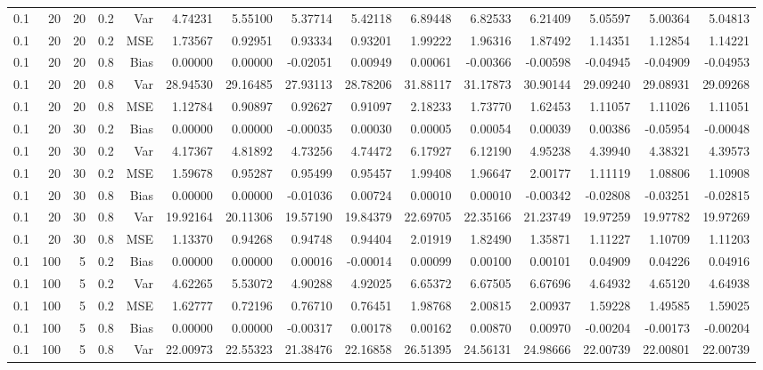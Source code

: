 \begin{table}[!htbp]
\begin{tabular}{lrrrrrrrrrrrrrr}
0.1 &  20 & 20 & 0.2 & Var & 4.74231 & 5.55100 & 5.37714 & 5.42118 & 6.89448 & 6.82533 & 6.21409 & 5.05597 & 5.00364 & 5.04813 \\
0.1 &  20 & 20 & 0.2 & MSE & 1.73567 & 0.92951 & 0.93334 & 0.93201 & 1.99222 & 1.96316 & 1.87492 & 1.14351 & 1.12854 & 1.14221 \\
0.1 &  20 & 20 & 0.8 & Bias & 0.00000 & 0.00000 & -0.02051 & 0.00949 & 0.00061 & -0.00366 & -0.00598 & -0.04945 & -0.04909 & -0.04953 \\
0.1 &  20 & 20 & 0.8 & Var & 28.94530 & 29.16485 & 27.93113 & 28.78206 & 31.88117 & 31.17873 & 30.90144 & 29.09240 & 29.08931 & 29.09268 \\
0.1 &  20 & 20 & 0.8 & MSE & 1.12784 & 0.90897 & 0.92627 & 0.91097 & 2.18233 & 1.73770 & 1.62453 & 1.11057 & 1.11026 & 1.11051 \\
0.1 &  20 & 30 & 0.2 & Bias & 0.00000 & 0.00000 & -0.00035 & 0.00030 & 0.00005 & 0.00054 & 0.00039 & 0.00386 & -0.05954 & -0.00048 \\
0.1 &  20 & 30 & 0.2 & Var & 4.17367 & 4.81892 & 4.73256 & 4.74472 & 6.17927 & 6.12190 & 4.95238 & 4.39940 & 4.38321 & 4.39573 \\
0.1 &  20 & 30 & 0.2 & MSE & 1.59678 & 0.95287 & 0.95499 & 0.95457 & 1.99408 & 1.96647 & 2.00177 & 1.11119 & 1.08806 & 1.10908 \\
0.1 &  20 & 30 & 0.8 & Bias & 0.00000 & 0.00000 & -0.01036 & 0.00724 & 0.00010 & 0.00010 & -0.00342 & -0.02808 & -0.03251 & -0.02815 \\
0.1 &  20 & 30 & 0.8 & Var & 19.92164 & 20.11306 & 19.57190 & 19.84379 & 22.69705 & 22.35166 & 21.23749 & 19.97259 & 19.97782 & 19.97269 \\
0.1 &  20 & 30 & 0.8 & MSE & 1.13370 & 0.94268 & 0.94748 & 0.94404 & 2.01919 & 1.82490 & 1.35871 & 1.11227 & 1.10709 & 1.11203 \\
0.1 & 100 &  5 & 0.2 & Bias & 0.00000 & 0.00000 & 0.00016 & -0.00014 & 0.00099 & 0.00100 & 0.00101 & 0.04909 & 0.04226 & 0.04916 \\
0.1 & 100 &  5 & 0.2 & Var & 4.62265 & 5.53072 & 4.90288 & 4.92025 & 6.65372 & 6.67505 & 6.67696 & 4.64932 & 4.65120 & 4.64938 \\
0.1 & 100 &  5 & 0.2 & MSE & 1.62777 & 0.72196 & 0.76710 & 0.76451 & 1.98768 & 2.00815 & 2.00937 & 1.59228 & 1.49585 & 1.59025 \\
0.1 & 100 &  5 & 0.8 & Bias & 0.00000 & 0.00000 & -0.00317 & 0.00178 & 0.00162 & 0.00870 & 0.00970 & -0.00204 & -0.00173 & -0.00204 \\
0.1 & 100 &  5 & 0.8 & Var & 22.00973 & 22.55323 & 21.38476 & 22.16858 & 26.51395 & 24.56131 & 24.98666 & 22.00739 & 22.00801 & 22.00739 \\

\end{tabular}
\end{table}
